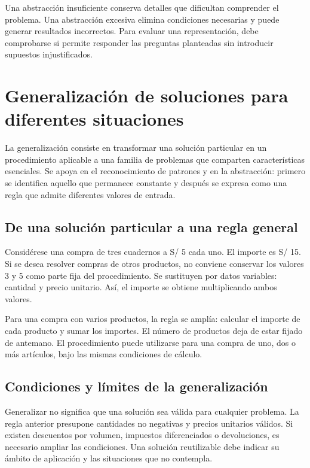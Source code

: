 Una abstracción insuficiente conserva detalles que dificultan comprender el problema. Una abstracción excesiva elimina condiciones necesarias y puede generar resultados incorrectos. Para evaluar una representación, debe comprobarse si permite responder las preguntas planteadas sin introducir supuestos injustificados.

\section{Generalización de soluciones para diferentes situaciones}

La generalización consiste en transformar una solución particular en un procedimiento aplicable a una familia de problemas que comparten características esenciales. Se apoya en el reconocimiento de patrones y en la abstracción: primero se identifica aquello que permanece constante y después se expresa como una regla que admite diferentes valores de entrada.

\subsection{De una solución particular a una regla general}

Considérese una compra de tres cuadernos a S/ 5 cada uno. El importe es S/ 15. Si se desea resolver compras de otros productos, no conviene conservar los valores 3 y 5 como parte fija del procedimiento. Se sustituyen por datos variables: cantidad y precio unitario. Así, el importe se obtiene multiplicando ambos valores.

Para una compra con varios productos, la regla se amplía: calcular el importe de cada producto y sumar los importes. El número de productos deja de estar fijado de antemano. El procedimiento puede utilizarse para una compra de uno, dos o más artículos, bajo las mismas condiciones de cálculo.



\subsection{Condiciones y límites de la generalización}

Generalizar no significa que una solución sea válida para cualquier problema. La regla anterior presupone cantidades no negativas y precios unitarios válidos. Si existen descuentos por volumen, impuestos diferenciados o devoluciones, es necesario ampliar las condiciones. Una solución reutilizable debe indicar su ámbito de aplicación y las situaciones que no contempla.

